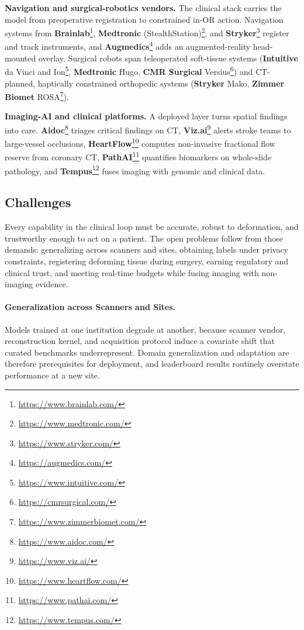 \textbf{Navigation and surgical-robotics vendors.} The clinical stack carries the model from preoperative registration to constrained in-OR action. Navigation systems from \textbf{Brainlab}\footnote{\url{https://www.brainlab.com/}}, \textbf{Medtronic} (StealthStation)\footnote{\url{https://www.medtronic.com/}}, and \textbf{Stryker}\footnote{\url{https://www.stryker.com/}} register and track instruments, and \textbf{Augmedics}\footnote{\url{https://augmedics.com/}} adds an augmented-reality head-mounted overlay. Surgical robots span teleoperated soft-tissue systems (\textbf{Intuitive} da Vinci and Ion\footnote{\url{https://www.intuitive.com/}}, \textbf{Medtronic} Hugo, \textbf{CMR Surgical} Versius\footnote{\url{https://cmrsurgical.com/}}) and CT-planned, haptically constrained orthopedic systems (\textbf{Stryker} Mako, \textbf{Zimmer Biomet} ROSA\footnote{\url{https://www.zimmerbiomet.com/}}).

\textbf{Imaging-AI and clinical platforms.} A deployed layer turns spatial findings into care. \textbf{Aidoc}\footnote{\url{https://www.aidoc.com/}} triages critical findings on CT, \textbf{Viz.ai}\footnote{\url{https://www.viz.ai/}} alerts stroke teams to large-vessel occlusions, \textbf{HeartFlow}\footnote{\url{https://www.heartflow.com/}} computes non-invasive fractional flow reserve from coronary CT, \textbf{PathAI}\footnote{\url{https://www.pathai.com/}} quantifies biomarkers on whole-slide pathology, and \textbf{Tempus}\footnote{\url{https://www.tempus.com/}} fuses imaging with genomic and clinical data.

\subsection{Challenges}
\label{subsec:p4-sec12-1-challenges}

Every capability in the clinical loop must be accurate, robust to deformation, and trustworthy enough to act on a patient. The open problems follow from those demands: generalizing across scanners and sites, obtaining labels under privacy constraints, registering deforming tissue during surgery, earning regulatory and clinical trust, and meeting real-time budgets while fusing imaging with non-imaging evidence.

\paragraph{Generalization across Scanners and Sites.} Models trained at one institution degrade at another, because scanner vendor, reconstruction kernel, and acquisition protocol induce a covariate shift that curated benchmarks underrepresent. 
Domain generalization and adaptation are therefore prerequisites for deployment, and leaderboard results routinely overstate performance at a new site.

